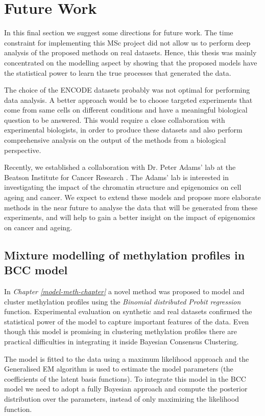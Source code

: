 \section{Future Work} \label{future-work-sect}
In this final section we suggest some directions for future work. The time constraint for implementing this MSc project did not allow us to perform deep analysis of the proposed methods on real datasets. Hence, this thesis was mainly concentrated on the modelling aspect by showing that the proposed models have the statistical power to learn the true processes that generated the data.

The choice of the ENCODE datasets probably was not optimal for performing data analysis. A better approach would be to choose targeted experiments that come from same cells on different conditions and have a meaningful biological question to be answered. This would require a close collaboration with experimental biologists, in order to produce these datasets and also perform comprehensive analysis on the output of the methods from a biological perspective. 

Recently, we established a collaboration with Dr. Peter Adams' lab at the Beatson Institute for Cancer Research \citep{Adams2015}. The Adams' lab is interested in investigating the impact of the chromatin structure and epigenomics on cell ageing and cancer. We expect to extend these models and propose more elaborate methods in the near future to analyse the data that will be generated from these experiments, and will help to gain a better insight on the impact of epigenomics on cancer and ageing.     

\subsection{Mixture modelling of methylation profiles in BCC model} \label{conc-meth-prof-bcc-subsect}
In \emph{Chapter \ref{model-meth-chapter}} a novel method was proposed to model and cluster methylation profiles using the \emph{Binomial distributed Probit regression} function. Experimental evaluation on synthetic and real datasets confirmed the statistical power of the model to capture important features of the data. Even though this model is promising in clustering methylation profiles there are practical difficulties in integrating it inside Bayesian Consensus Clustering. 

The model is fitted to the data using a maximum likelihood approach and the Generalised EM algorithm is used to estimate the model parameters (\ie the coefficients of the latent basis functions). To integrate this model in the BCC model we need to adopt a fully Bayesian approach and compute the posterior distribution over the parameters, instead of only maximizing the likelihood function.

